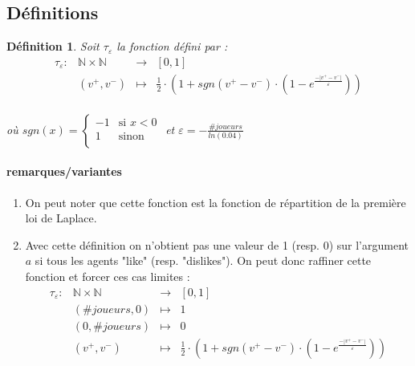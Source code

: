 \documentclass[12pt]{article}
\theoremstyle{defi}
\newtheorem{definition}{Définition}[section]
\theoremstyle{not}
\theoremstyle{prob}
\begin{document}
  \subsection{Définitions}
  \label{ref:def_tau}
      \begin{definition}
        Soit $\tau_\varepsilon$ la fonction défini par :
        $$\begin{array}{rclc}
          \tau_\varepsilon :  & \mathbb{N} \times \mathbb{N} & \longrightarrow & [0, 1] \\
          & (v^+,v^-) & \longmapsto & \frac{1}{2} \cdot \left(1 + sgn(v^+ - v^-) \cdot \left(1 - e^{\frac{-|v^+ - v^-|}{\varepsilon}}\right)\right)\\
        \end{array}$$

        où $sgn(x) = \left\{
        \begin{array}{ll}
          -1  & \mbox{si } x < 0 \\
          1 & \mbox{sinon} \\
        \end{array}
        \right.$ et $\varepsilon = - \frac{\#joueurs}{ln(0.04)}$
      \end{definition}

      \paragraph{remarques/variantes}
      \label{ref:rem_def_tau}
        \begin{enumerate}
          \item On peut noter que cette fonction est la fonction de répartition de la première loi de Laplace.
          \item Avec cette définition on n'obtient pas une valeur de 1 (resp. $0$) sur l'argument $a$ si tous les agents "like" (resp. "dislikes"). On peut donc raffiner cette fonction et forcer ces cas limites :
          $$\begin{array}{rclc}
            \tau_\varepsilon :  & \mathbb{N} \times \mathbb{N} & \longrightarrow & [0, 1] \\
            & (\#joueurs, 0) & \longmapsto & 1 \\
            & (0, \#joueurs) & \longmapsto & 0 \\
            & (v^+,v^-) & \longmapsto & \frac{1}{2} \cdot \left(1 + sgn(v^+ - v^-) \cdot \left(1 - e^{\frac{-|v^+ - v^-|}{\varepsilon}}\right)\right)\\
          \end{array}$$
        \end{enumerate}
\end{document}
